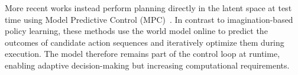 More recent works instead perform planning directly in the latent space at test time using Model Predictive Control (MPC)~\cite{testud1978model, Hansen2022tdmpc,hansen2024tdmpc,bar2025navigationworldmodels,zhou2025dino-wm,sobal2025stresstesting}. In contrast to imagination-based policy learning, these methods use the world model online to predict the outcomes of candidate action sequences and iteratively optimize them during execution. The model therefore remains part of the control loop at runtime, enabling adaptive decision-making but increasing computational requirements.
